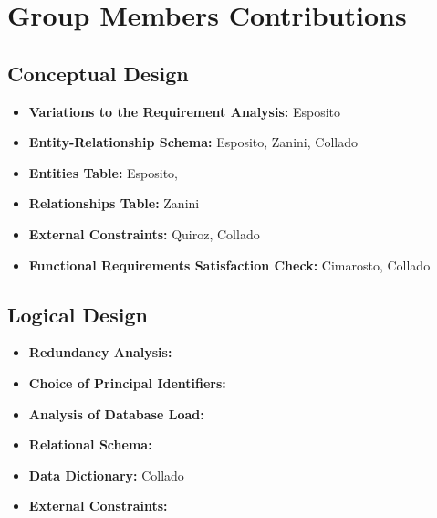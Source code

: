 \section{Group Members Contributions}


\subsection{Conceptual Design}
\begin{itemize}
	\item \textbf{Variations to the Requirement Analysis:} Esposito
	\item \textbf{Entity-Relationship Schema:} Esposito, Zanini, Collado 
	\item \textbf{Entities Table:} Esposito, 
	\item \textbf{Relationships Table:} Zanini
	\item \textbf{External Constraints:} Quiroz, Collado
	\item \textbf{Functional Requirements Satisfaction Check:} Cimarosto, Collado
\end{itemize}

\subsection{Logical Design}
\begin{itemize}
	\item \textbf{Redundancy Analysis:} 
	\item \textbf{Choice of Principal Identifiers:}
	\item \textbf{Analysis of Database Load:}
	\item \textbf{Relational Schema:}
	\item \textbf{Data Dictionary:} Collado
	\item \textbf{External Constraints:}
\end{itemize}	